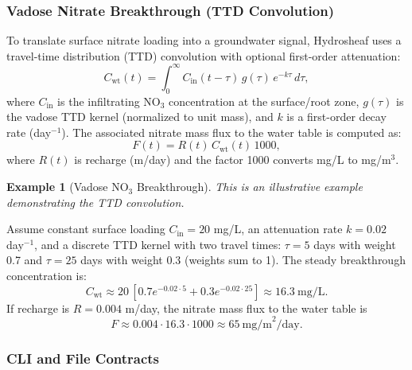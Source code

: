 \documentclass[12pt,a4paper]{article}
\theoremstyle{plain}
\theoremstyle{definition}
\newtheorem{example}[theorem]{Example}
\theoremstyle{remark}
\begin{document}
\subsubsection{Vadose Nitrate Breakthrough (TTD Convolution)}

To translate surface nitrate loading into a groundwater signal, Hydrosheaf uses a travel-time distribution (TTD) convolution with optional first-order attenuation:
\begin{equation}
	C_{\text{wt}}(t) = \int_{0}^{\infty} C_{\text{in}}(t-\tau)\, g(\tau)\, e^{-k\tau}\, d\tau,
\end{equation}
where $C_{\text{in}}$ is the infiltrating NO$_3$ concentration at the surface/root zone, $g(\tau)$ is the vadose TTD kernel (normalized to unit mass), and $k$ is a first-order decay rate (day$^{-1}$). The associated nitrate mass flux to the water table is computed as:
\begin{equation}
	F(t) = R(t)\, C_{\text{wt}}(t)\, 1000,
\end{equation}
where $R(t)$ is recharge (m/day) and the factor 1000 converts mg/L to mg/m$^3$.

\begin{example}[Vadose NO$_3$ Breakthrough]\label{ex:vadose_no3}
	\textit{This is an illustrative example demonstrating the TTD convolution.}

	Assume constant surface loading $C_{\text{in}} = 20$ mg/L, an attenuation rate $k = 0.02$ day$^{-1}$, and a discrete TTD kernel with two travel times: $\tau=5$ days with weight 0.7 and $\tau=25$ days with weight 0.3 (weights sum to 1). The steady breakthrough concentration is:
	\begin{equation}
		C_{\text{wt}} \approx 20\,[0.7 e^{-0.02\cdot 5} + 0.3 e^{-0.02\cdot 25}] \approx 16.3~\text{mg/L}.
	\end{equation}
	If recharge is $R = 0.004$ m/day, the nitrate mass flux to the water table is
	\begin{equation}
		F \approx 0.004 \cdot 16.3 \cdot 1000 \approx 65~\text{mg/m}^2/\text{day}.
	\end{equation}
\end{example}

\subsubsection{CLI and File Contracts}
\end{document}
